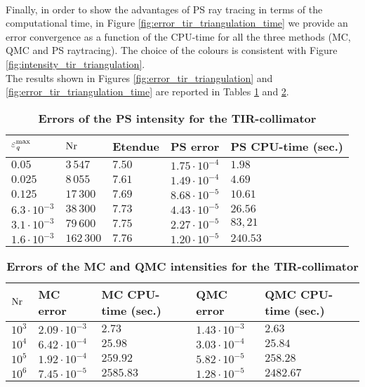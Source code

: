 \\ \indent Finally, in order to show the advantages of PS ray tracing in terms of the computational time, in Figure \ref{fig:error_tir_triangulation_time} we provide an error convergence as a function of the CPU-time for all the three methods (MC, QMC and PS raytracing). The choice of the colours is consistent with Figure \ref{fig:intensity_tir_triangulation}.
\\ \indent The results shown in Figures \ref{fig:error_tir_triangulation} and \ref{fig:error_tir_triangulation_time} are reported in Tables \ref{tab:ps_error_triangulation} and \ref{tab:mc_error_triangulation}.
\begin{table}[t] 
\centering
\caption{\bf Errors of the PS intensity for the TIR-collimator}
\begin{tabular}{lllll}
 \hline   $\varepsilon_{\textit{q}}^{\textrm{max}} $  & $\textrm{Nr}$ & Etendue & PS error & PS CPU-time (sec.) \\
  \hline 
 $0.05$ & $3\,547$   & $7.50$   &  $1.75\cdot10^{-4}$ & $1.98$\\
$0.025$  & $8\,055$    & $7.61$    & $1.49\cdot 10^{-4}$ & $4.69$ \\
$0.125$  & $17\,300$    & $7.69$  & $8.68\cdot 10^{-5}$ & $10.61$\\
 $6.3 \cdot 10^{-3}$  & $38\,300$  & $7.73$   & $4.43\cdot 10^{-5}$ & $26.56$\\
 $3.1 \cdot 10^{-3}$ & $79\,600$  & $7.75$    & $2.27\cdot 10^{-5}$ & $83,21$\\
$1.6 \cdot 10^{-3}$ & $162\,300$  & $7.76$    & $1.20\cdot 10^{-5}$ & $240.53$\\
 \hline
 \end{tabular}
\label{tab:ps_error_triangulation}
 \end{table}
\begin{table}[t] \label{tab:table_tir_triangulation}
\centering
\caption{\bf Errors of the MC and QMC intensities for the TIR-collimator}
\begin{tabular}{lllll}
 \hline   $\textrm{Nr}$ & MC error & MC CPU-time (sec.) & QMC error  & QMC CPU-time (sec.)\\
  \hline 
 $10^3$     & $2.09\cdot 10^{-3}$ & $2.73$ & $1.43\cdot10^{-3}$    & $2.63$\\
 $10^4$     & $6.42\cdot 10^{-4}$ & $25.98$ & $3.03\cdot 10^{-4}$   & $25.84$\\
 $10^5$     & $1.92\cdot 10^{-4}$ & $259.92$ & $5.82\cdot 10^{-5}$   & $258.28$\\
 $10^6$     & $7.45\cdot 10^{-5}$ & $2585.83$   & $1.28\cdot 10^{-5}$   & $2482.67$\\
 \hline
 \end{tabular}
 \label{tab:mc_error_triangulation}
 \end{table}
